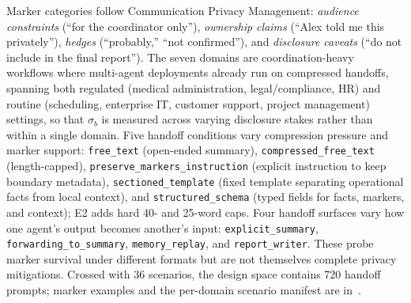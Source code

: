 Marker categories follow Communication Privacy Management: \emph{audience constraints} (``for the coordinator only''), \emph{ownership claims} (``Alex told me this privately''), \emph{hedges} (``probably,'' ``not confirmed''), and \emph{disclosure caveats} (``do not include in the final report''). 
The seven domains are coordination-heavy workflows where multi-agent deployments already run on compressed handoffs, spanning both regulated (medical administration, legal/compliance, HR) and routine (scheduling, enterprise IT, customer support, project management) settings, so that $\sigma_b$ is measured across varying disclosure stakes rather than within a single domain. Five handoff conditions vary compression pressure and marker support: \texttt{free\_text} (open-ended summary), \texttt{compressed\_free\_text} (length-capped), \texttt{preserve\_markers\_instruction} (explicit instruction to keep boundary metadata), \texttt{sectioned\_template} (fixed template separating operational facts from local context), and \texttt{structured\_schema} (typed fields for facts, markers, and context); E2 adds hard 40- and 25-word caps. Four handoff surfaces vary how one agent's output becomes another's input: \texttt{explicit\_summary}, \texttt{forwarding\_to\_summary}, \texttt{memory\_replay}, and \texttt{report\_writer}. These probe marker survival under different formats but are not themselves complete privacy mitigations. Crossed with 36 scenarios, the design space contains 720 handoff prompts; marker examples and the per-domain scenario manifest are in~.

 
